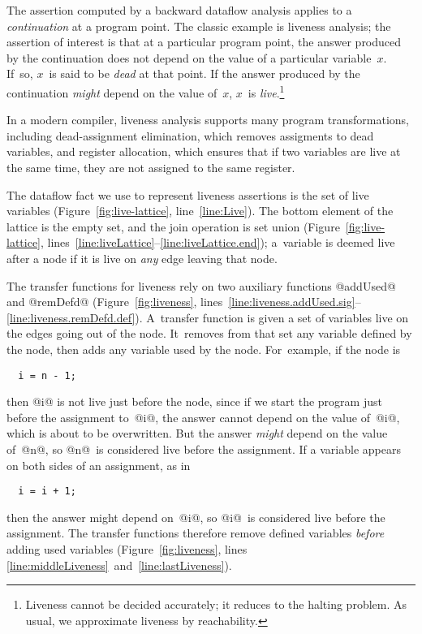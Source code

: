 \documentclass[blockstyle,preprint,natbib,nocopyrightspace]{sigplanconf}
\newcommand\lineref[1]{line~\ref{line:#1}}
\newcommand\linepairref[2]{lines \ref{line:#1}~and~\ref{line:#2}}
\newcommand\linerangeref[2]{\mbox{lines~\ref{line:#1}--\ref{line:#2}}}
\newcommand\seclabel[1]{\label{sec:#1}}
\newcommand\figref[1]{Figure~\ref{fig:#1}}
\begin{document}
\seclabel{liveness}

The assertion computed by 
a backward dataflow analysis applies to a
\emph{continuation} at a program point.
The classic example is liveness analysis;
the assertion of interest is that at a particular program point,
the answer produced by the continuation does not depend on
the value of a particular variable~$x$.
If~so, $x$~is said to be \emph{dead} at that point.
If the answer produced by the continuation \emph{might} depend on the
value of~$x$, $x$~is \emph{live}.\footnote
{Liveness cannot be decided accurately; it reduces to the halting problem.
As usual, we approximate liveness by reachability.}

In a modern compiler, liveness analysis supports many program
transformations,
including
dead-assignment elimination,
which removes assigments to dead variables, 
and register allocation, which
ensures that if two variables are 
live at the same time, they are not assigned to the same register. 

The dataflow fact we use to represent liveness assertions is the set of
live variables (\figref{live-lattice}, \lineref{Live}).
The bottom element of the lattice is the empty set, and the join
operation is set union (\figref{live-lattice},
\linerangeref{liveLattice}{liveLattice.end}); 
a~variable is deemed live after a node if it is live on \emph{any} edge leaving that
node.

The transfer functions for liveness rely on two auxiliary functions
@addUsed@ and @remDefd@ (\figref{liveness}, 
\linerangeref{liveness.addUsed.sig}{liveness.remDefd.def}).
A~transfer function is given a set of variables live on the edges
going out of the node.
It~removes from that set any variable
defined by the node, then adds any variable used by the
node.
\ifcutting\else
For~example, if the node is
\begin{verbatim}
  i = n - 1;
\end{verbatim}
then @i@ is not live just before the node, since if we start the
program just before the assignment to~@i@, the answer cannot 
depend on the value of~@i@, which is about to be overwritten.
But the answer \emph{might} depend on the value of~@n@, so
@n@~is considered live before the assignment.
If a variable appears on both sides of an
assignment, as in \ifpagetuning{\looseness=-1 \par}\fi
\begin{verbatim}
  i = i + 1;
\end{verbatim}
then the answer might depend on~@i@, so @i@~is considered live
before the assignment.
The transfer functions
therefore
remove defined variables \emph{before} adding used variables
\fi
(\figref{liveness}, \linepairref{middleLiveness}{lastLiveness}). 
\end{document}
